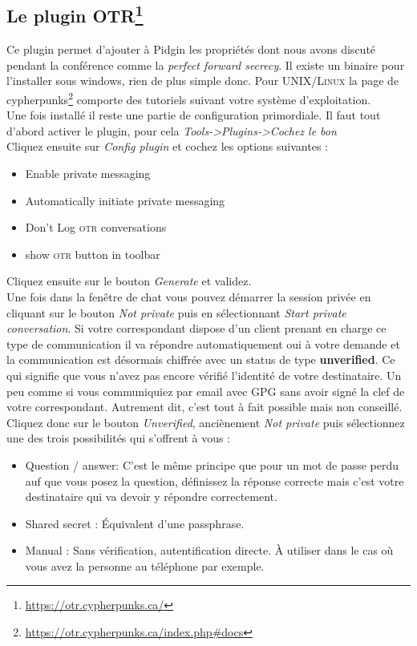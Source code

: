\documentclass[a4paper]{article}
\begin{document}
\subsection{Le plugin OTR\protect\footnote{\url{https://otr.cypherpunks.ca/}}}
Ce plugin permet d'ajouter à Pidgin les propriétés dont nous avons discuté pendant
la conférence comme la \emph{perfect forward secrecy}.
Il existe un binaire pour l'installer sous windows, rien de plus simple donc.
Pour \textsc{UNIX/Linux} la page de cypherpunks\protect\footnote{\url{https://otr.cypherpunks.ca/index.php\#docs}}
comporte des tutoriels suivant votre système d'exploitation.
\\
Une fois installé il reste une partie de configuration primordiale. Il faut tout
d'abord activer le plugin, pour cela \emph{Tools->Plugins->Cochez le bon}
\\
Cliquez ensuite sur \emph{Config plugin} et cochez les options suivantes :
\begin{itemize}
        \item Enable private messaging
        \item Automatically initiate private messaging
        \item Don't Log \textsc{otr} conversations
        \item show \textsc{otr} button in toolbar
\end{itemize}
Cliquez ensuite sur le bouton \emph{Generate} et validez.
\\
Une fois dans la fenêtre de chat vous pouvez démarrer la session privée en cliquant
sur le bouton \emph{Not private} puis en sélectionnant \emph{Start private conversation}.
Si votre correspondant dispose d'un client prenant en charge ce type de communication il
va répondre automatiquement oui à votre demande et la communication est désormais chiffrée
avec un status de type \textbf{unverified}. Ce qui signifie que vous n'avez pas encore
vérifié l'identité de votre destinataire. Un peu comme si vous communiquiez par email
avec \textsc{GPG} sans avoir signé la clef de votre correspondant. Autrement dit, c'est
tout à fait possible mais non conseillé. Cliquez donc sur le bouton \emph{Unverified},
anciènement \emph{Not private} puis sélectionnez une des trois possibilités qui s'offrent à vous :
\begin{itemize}
    \item Question / answer: C'est le même principe que pour un mot de passe perdu
        auf que vous posez la question, définissez la réponse correcte mais c'est votre
        destinataire qui va devoir y répondre correctement.
    \item Shared secret : Équivalent d'une passphrase.
    \item Manual : Sans vérification, autentification directe. À utiliser dans le cas
        où vous avez la personne au téléphone par exemple.
\end{itemize}
\end{document}
